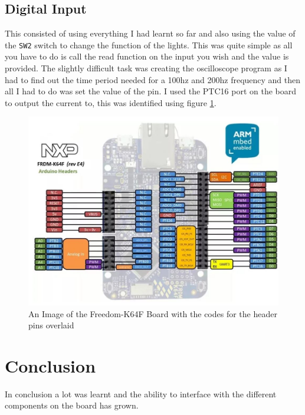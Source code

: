 \documentclass[a4paper,12pt]{scrartcl}
\begin{document}
{		\subsection{Digital Input}
		{
			This consisted of using everything I had learnt so far and also using the value of the \lstinline|SW2| switch to change the function of the lights. This was quite simple as all you have to do is call the read function on the input you wish and the value is provided. The slightly difficult task was creating the oscilloscope program as I had to find out the time period needed for a 100hz and 200hz frequency and then all I had to do was set the value of the pin. I used the PTC16 port on the board to output the current to, this was identified using figure \ref{img:FRDM-K64F-HEADERPINS}.
			\begin{figure}
				\centering
				\includegraphics[width=\textwidth]{frdm_k64f_reve4_header_pinout}
				\caption{An Image of the Freedom-K64F Board with the codes for the header pins overlaid\cite{armlimited2015}}
				\label{img:FRDM-K64F-HEADERPINS}
			\end{figure}
		}
	}

	\section{Conclusion}
	{
		In conclusion a lot was learnt and the ability to interface with the different components on the board has grown.
	}
	
	\newpage
	
	\printbibliography[heading=bibintoc,title=References]
\end{document}
